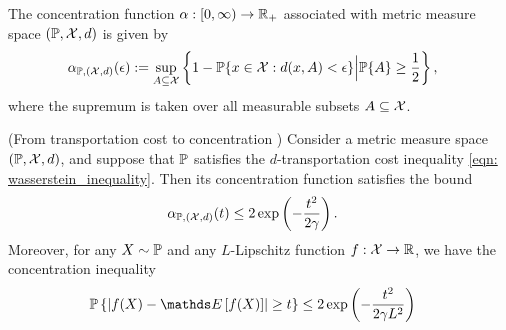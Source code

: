\documentclass[11pt]{article}
\begin{document}
\begin{itemize}
\begin{definition}\citep{wainwright2019high} The concentration function $\alpha: [0, \infty) \rightarrow  {\mathbb R}_{+}$ associated with metric
measure space $({\mathbb P}, {\mathcal X}, d)$ is given by
\begin{align}
\alpha_{{\mathbb P},({\mathcal X},d)}(\epsilon) &:= \sup_{A \subseteq {\mathcal X} }\left\{1- {\mathbb P}\{x\in {\mathcal X}: d(x, A) < \epsilon\} \Big| {\mathbb P}\{A\} \ge \frac{1}{2}\right\},  \label{eqn: concentration_function}
\end{align} where the supremum is taken over all measurable subsets $A \subseteq {\mathcal X}$.
\end{definition}

\begin{theorem}(From transportation cost to concentration \citep{wainwright2019high}) Consider a metric measure space $({\mathbb P}, {\mathcal X}, d)$, and suppose that ${\mathbb P}$ satisfies the $d$-transportation cost inequality \eqref{eqn: wasserstein_inequality}. Then its concentration function satisfies the bound
\begin{align}
\alpha_{{\mathbb P},({\mathcal X},d)}(t) &\le 2\exp\left(-\frac{t^2}{2 \gamma}\right).  \label{eqn: wasserstein_concentration_1}
\end{align}
Moreover, for any $X \sim {\mathbb P}$ and any $L$-Lipschitz function $f : {\mathcal X} \rightarrow {\mathbb R}$, we have the concentration inequality
\begin{align}
\bP\set{\abs{f(X)  - \E{}{f(X)} } \ge t} &\le 2\exp\paren{-\frac{t^2}{2 \gamma L^2}} \label{eqn: wasserstein_concentration_2}
\end{align}
\end{theorem}

\end{itemize}
\end{document}
